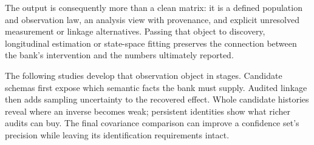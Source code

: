 The output is consequently more than a clean matrix: it is a defined
population and observation law, an analysis view with provenance, and
explicit unresolved measurement or linkage alternatives. Passing that
object to discovery, longitudinal estimation or state-space fitting
preserves the connection between the bank's intervention and the
numbers ultimately reported.

The following studies develop that observation object in stages. Candidate
schemas first expose which semantic facts the bank must supply. Audited
linkage then adds sampling uncertainty to the recovered effect. Whole
candidate histories reveal where an inverse becomes weak; persistent
identities show what richer audits can buy. The final covariance comparison
can improve a confidence set's precision while leaving its identification
requirements intact.








